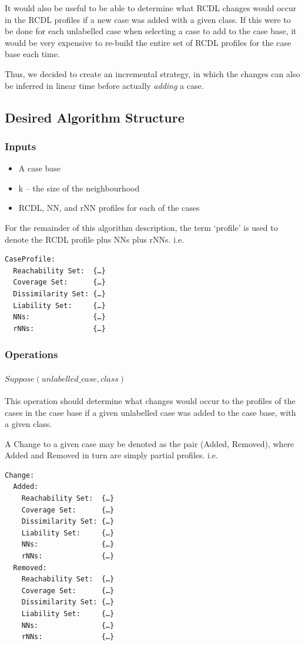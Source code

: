 \documentclass[a4paper,11pt]{report}
\begin{document}
It would also be useful to be able to determine what RCDL changes would occur in the RCDL profiles if a new case was added with a given class. If this were to be done for each unlabelled case when selecting a case to add to the case base, it would be very expensive to re-build the entire set of RCDL profiles for the case base each time.

Thus, we decided to create an incremental strategy, in which the changes can also be inferred in linear time before actually \emph{adding} a case.

\subsection{Desired Algorithm Structure}
\subsubsection{Inputs}
\begin{itemize}
	\item A case base 
	\item k – the size of the neighbourhood
	\item RCDL, NN, and rNN profiles for each of the cases
\end{itemize}

For the remainder of this algorithm description, the term `profile' is used to denote the RCDL profile plus NNs plus rNNs. i.e. 
\begin{verbatim}
CaseProfile:  
  Reachability Set:  {…}
  Coverage Set:      {…}
  Dissimilarity Set: {…}
  Liability Set:     {…}
  NNs:               {…}
  rNNs:              {…}
\end{verbatim}

\subsubsection{Operations}
\paragraph{$Suppose(unlabelled\_case, class)$}
This operation should determine what changes would occur to the profiles of the cases in the case base if a given unlabelled case was added to the case base, with a given class.

A Change to a given case may be denoted as the pair (Added, Removed), where Added and Removed in turn are simply partial profiles. i.e.
\begin{verbatim}
Change:
  Added:
    Reachability Set:  {…}
    Coverage Set:      {…}
    Dissimilarity Set: {…}
    Liability Set:     {…}
    NNs:               {…}
    rNNs:              {…}
  Removed:
    Reachability Set:  {…}
    Coverage Set:      {…}
    Dissimilarity Set: {…}
    Liability Set:     {…}
    NNs:               {…}
    rNNs:              {…}
\end{verbatim}
\end{document}
